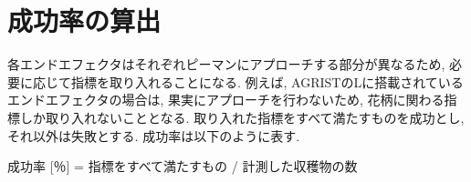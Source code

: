 \section{成功率の算出}
各エンドエフェクタはそれぞれピーマンにアプローチする部分が異なるため, 必要に応じて指標を取り入れることになる.
例えば, AGRISTのLに搭載されているエンドエフェクタの場合は, 果実にアプローチを行わないため, 花柄に関わる指標しか取り入れないこととなる.
取り入れた指標をすべて満たすものを成功とし, それ以外は失敗とする.
成功率は以下のように表す.

成功率 [％] = 指標をすべて満たすもの / 計測した収穫物の数

